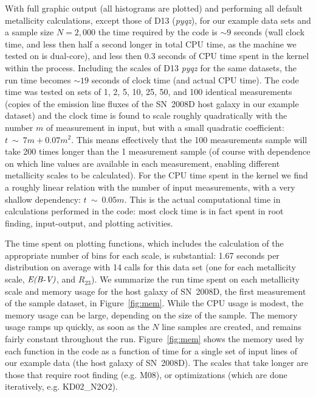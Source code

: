 \documentclass{emulateapj}
\newcommand{\ebmv}{\ensuremath{\mathrm{\emph{E(B-V)}}}}
\begin{document}
With full graphic output (all histograms are plotted) and performing all default metallicity calculations, except those of D13 (\emph{pyqz}), for our example data sets and a sample size $N=2,000$ the time required by the code is $\sim9$ seconds (wall clock time, and less then half a second longer in total CPU time, as the machine we tested on is dual-core), and less then 0.3 seconds of CPU time spent in the kernel within the process. Including  the scales of D13 \emph{pyqz} for the same datasets, the run time becomes $\sim19$ seconds of clock time (and actual CPU time). 
The code time was tested on sets of 1, 2, 5, 10, 25, 50, and 100 identical measurements (copies of the emission line fluxes of  the SN~2008D host galaxy in our example dataset) and the clock time is found to scale roughly quadratically with the number $m$ of measurement in input, but with a small quadratic coefficient: $t~\sim~7m+0.07m^2$. This means effectively that the 100 measurements sample will take 200 times longer than the 1 measurement sample (of course with dependence on which line values are available in each measurement, enabling different metallicity scales to be calculated). For the CPU time spent in the kernel we find a roughly linear relation with the number of input measurements, with a very shallow dependency: $t~\sim~ 0.05m$. This is the actual computational time in calculations performed in the code: most clock time is in fact spent in root finding, input-output, and plotting activities.


The time spent on plotting functions, which includes the calculation of the appropriate number of bins for each scale, is substantial: 1.67 seconds per distribution on average with 14 calls for this data set (one for each metallicity scale, \ebmv, and $R_{23}$). 
We summarize the run time spent on each metallicity scale and memory usage for the host galaxy of SN~2008D, the first measurement of the sample dataset, in Figure~\ref{fig:mem}. While the CPU usage is modest, the memory usage can be large, depending on the size of the sample.  The memory usage ramps up quickly, as soon as the $N$ line samples are created, 
and remains fairly constant throughout the run.  Figure~\ref{fig:mem} shows the memory used by each function in the code as a function of time for a single set of input lines of our example data (the host galaxy of SN~2008D). The scales that take longer are those that require root finding (e.g. M08), or optimizations (which are done iteratively, e.g. KD02\_N2O2).
\end{document}
